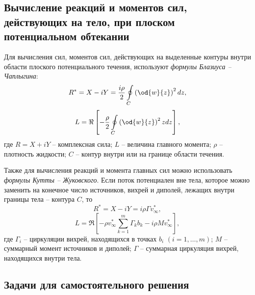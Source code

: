 \documentclass[a4paper, 14pt]{extarticle}
\begin{document}
\subsection{Вычисление реакций и моментов сил, действующих на тело, при плоском потенциальном обтекании}
	

			
Для вычисления сил, моментов сил, действующих на выделенные контуры внутри области плоского потенциального течения, используют \textit{формулы Блазиуса -- Чаплыгина}:
\[
R^* = X - i Y = \frac{i\rho}{2} \oint\limits_C \left(\od{w}{z} \right)^2 dz,
\]	
\[
L = \Re \left[
-\frac{\rho}{2}\oint\limits_C \left(\od{w}{z} \right)^2 zdz
\right],
\]
где $R=X+i Y$ -- комплексная сила; $L$ -- величина главного момента; $\rho$ -- плотность жидкости; $C$ -- контур внутри или на границе области течения.

Также для вычисления реакций и момента главных сил можно использовать \textit{формулы Кутты -- Жуковского}. Если поток потенциален вне тела, которое можно заменить на конечное число источников, вихрей и диполей, лежащих внутри границы тела -- контура $C$, то
\[
R^* =  X - iY = i\rho\Gamma v_\infty^*,		
\]
\[
L = \Re \left[
-\rho v_\infty^*\sum\limits_{k=1}^m\Gamma_kb_k-i\rho M v_\infty^*
\right],
\]
где
$\Gamma_i$ -- циркуляции вихрей, находящихся в точках $b_i$ $(i=1,\ldots,m)$; $M$ -- суммарный момент источников и диполей; $\Gamma$ -- суммарная циркуляция вихрей, находящихся внутри тела.



\subsection{Задачи для самостоятельного решения}
\end{document}
